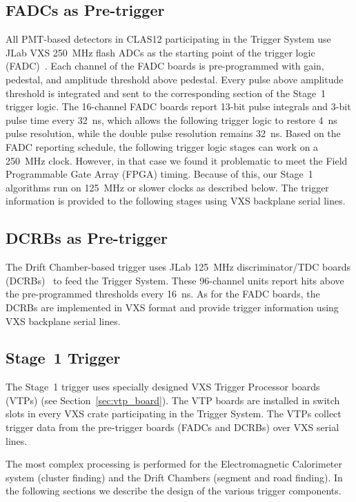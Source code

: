 \subsection{FADCs as Pre-trigger}

All PMT-based detectors in CLAS12 participating in the Trigger System use JLab VXS 250~MHz flash ADCs
as the starting point of the trigger logic (FADC)~\cite{daq-ref}. Each channel of the FADC boards is
pre-programmed with gain, pedestal, and amplitude threshold above pedestal. Every pulse above amplitude
threshold is integrated and sent to the corresponding section of the Stage~1 trigger logic. The 16-channel
FADC boards report 13-bit pulse integrals and 3-bit pulse time every 32~ns, which allows the following trigger
logic to restore 4~ns pulse resolution, while the double pulse resolution remains 32~ns. Based on the FADC
reporting schedule, the following trigger logic stages can work on a 250~MHz clock. However, in that case we
found it problematic to meet the Field Programmable Gate Array (FPGA) timing. Because of this, our Stage~1
algorithms run on 125~MHz or slower clocks as described below. The trigger information is provided to the
following stages using VXS backplane serial lines.

\subsection{DCRBs as Pre-trigger}

The Drift Chamber-based trigger uses JLab 125~MHz discriminator/TDC boards (DCRBs)~\cite{daq-ref} to
feed the Trigger System. These 96-channel units report hits above the pre-programmed thresholds every
16~ns. As for the FADC boards, the DCRBs are implemented in VXS format and provide trigger information
using VXS backplane serial lines.

\subsection{Stage~1 Trigger} 

The Stage~1 trigger uses specially designed VXS Trigger Processor boards (VTPs) (see
Section~\ref{sec:vtp_board}). The VTP boards are installed in switch slots in every VXS crate participating
in the Trigger System. The VTPs collect trigger data from the pre-trigger boards (FADCs and DCRBs) over
VXS serial lines.

The most complex processing is performed for the Electromagnetic Calorimeter system (cluster finding) and
the Drift Chambers (segment and road finding). In the following sections we describe the design of the various
trigger components.

